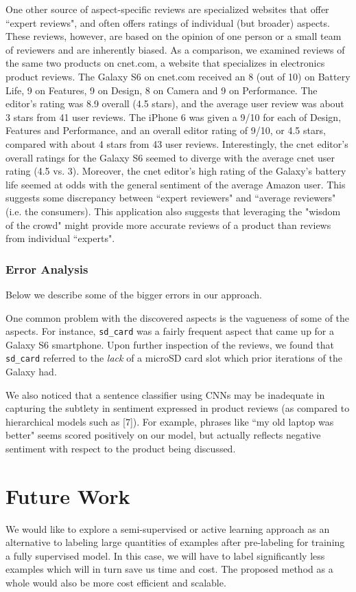 \documentclass{article} %
\begin{document}
One other source of aspect-specific reviews are specialized websites that offer ``expert reviews", and often offers ratings of individual (but broader) aspects. These reviews, however, are based on the opinion of one person or a small team of reviewers and are inherently biased. As a comparison, we examined reviews of the same two products on cnet.com, a website that specializes in electronics product reviews. The Galaxy S6 on cnet.com received an 8 (out of 10) on Battery Life, 9 on Features, 9 on Design, 8 on Camera and 9 on Performance. The editor's rating was 8.9 overall (4.5 stars), and the average user review was about 3 stars from 41 user reviews. The iPhone 6 was given a 9/10 for each of Design, Features and Performance, and an overall editor rating of 9/10, or 4.5 stars, compared with about 4 stars from 43 user reviews. Interestingly, the cnet editor's overall ratings for the Galaxy S6 seemed to diverge with the average cnet user rating (4.5 vs. 3). Moreover, the cnet editor's high rating of the Galaxy's battery life seemed at odds with the general sentiment of the average Amazon user. This suggests some discrepancy between ``expert reviewers" and ``average reviewers" (i.e. the consumers). This application also suggests that leveraging the "wisdom of the crowd" might provide more accurate reviews of a product than reviews from individual ``experts".

\subsubsection{Error Analysis}
Below we describe some of the bigger errors in our approach.

One common problem with the discovered aspects is the vagueness of some of the aspects. For instance, \texttt{sd\_card} was a fairly frequent aspect that came up for a Galaxy S6 smartphone. Upon further inspection of the reviews, we found that \texttt{sd\_card} referred to the \textit{lack} of a microSD card slot which prior iterations of the Galaxy had.

We also noticed that a sentence classifier using CNNs may be inadequate in capturing the subtlety in sentiment expressed in product reviews (as compared to hierarchical models such as [7]). For example, phrases like ``my old laptop was better" seems scored positively on our model, but actually reflects negative sentiment with respect to the product being discussed.

\section{Future Work}
We would like to explore a semi-supervised or active learning approach as an alternative to labeling large quantities of examples after pre-labeling for training a fully supervised model. In this case, we will have to label significantly less examples which will in turn save us time and cost. The proposed method as a whole would also be more cost efficient and scalable.
\end{document}
